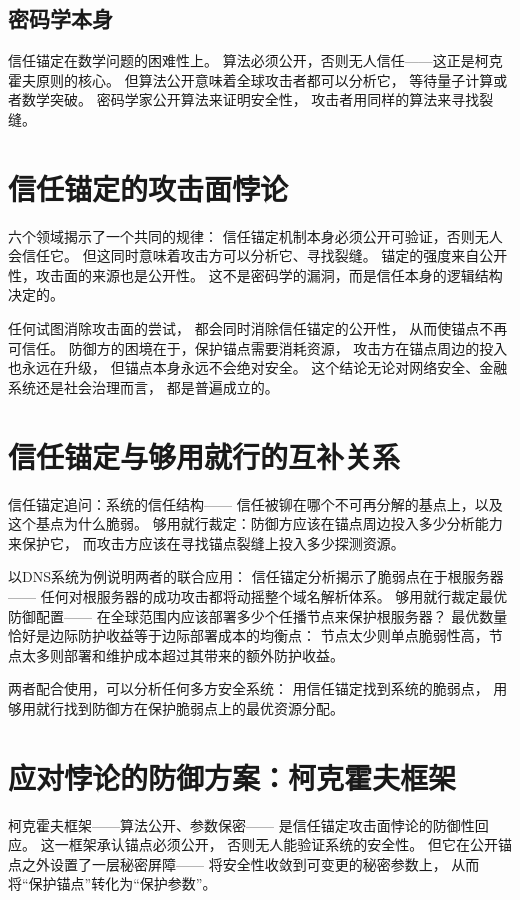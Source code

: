 \documentclass[11pt,a4paper]{article}
\begin{document}
\subsection{密码学本身}

信任锚定在数学问题的困难性上。
算法必须公开，否则无人信任——这正是柯克霍夫原则的核心。
但算法公开意味着全球攻击者都可以分析它，
等待量子计算或者数学突破。
密码学家公开算法来证明安全性，
攻击者用同样的算法来寻找裂缝。

\section{信任锚定的攻击面悖论}

六个领域揭示了一个共同的规律：
信任锚定机制本身必须公开可验证，否则无人会信任它。
但这同时意味着攻击方可以分析它、寻找裂缝。
锚定的强度来自公开性，攻击面的来源也是公开性。
这不是密码学的漏洞，而是信任本身的逻辑结构决定的。

任何试图消除攻击面的尝试，
都会同时消除信任锚定的公开性，
从而使锚点不再可信任。
防御方的困境在于，保护锚点需要消耗资源，
攻击方在锚点周边的投入也永远在升级，
但锚点本身永远不会绝对安全。
这个结论无论对网络安全、金融系统还是社会治理而言，
都是普遍成立的。

\section{信任锚定与够用就行的互补关系}

信任锚定追问：系统的信任结构——
信任被铆在哪个不可再分解的基点上，以及这个基点为什么脆弱。
够用就行裁定：防御方应该在锚点周边投入多少分析能力来保护它，
而攻击方应该在寻找锚点裂缝上投入多少探测资源。

以DNS系统为例说明两者的联合应用：
信任锚定分析揭示了脆弱点在于根服务器——
任何对根服务器的成功攻击都将动摇整个域名解析体系。
够用就行裁定最优防御配置——
在全球范围内应该部署多少个任播节点来保护根服务器？
最优数量恰好是边际防护收益等于边际部署成本的均衡点：
节点太少则单点脆弱性高，节点太多则部署和维护成本超过其带来的额外防护收益。

两者配合使用，可以分析任何多方安全系统：
用信任锚定找到系统的脆弱点，
用够用就行找到防御方在保护脆弱点上的最优资源分配。

\section{应对悖论的防御方案：柯克霍夫框架}

柯克霍夫框架——算法公开、参数保密——
是信任锚定攻击面悖论的防御性回应。
这一框架承认锚点必须公开，
否则无人能验证系统的安全性。
但它在公开锚点之外设置了一层秘密屏障——
将安全性收敛到可变更的秘密参数上，
从而将“保护锚点”转化为“保护参数”。
\end{document}
